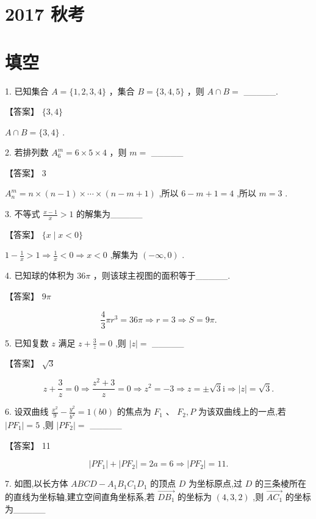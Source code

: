 \documentclass[10pt]{article}
\begin{document}
\section*{2017 秋考}

\section*{填空}

1. 已知集合 \(A = \{ 1,2,3,4\}\) ，集合 \(B = \{ 3,4,5\}\) ，则 \(A \cap  B =\) \_\_\_\_\_.

【答案】 \(\{ 3,4\}\)

\(A \cap  B = \{ 3,4\}\) .

2. 若排列数 \({A}_{6}^{m} = 6 \times  5 \times  4\) ，则 \(m =\) \_\_\_\_\_

【答案】 3

\({A}_{n}^{m} = n \times  \left( {n - 1}\right)  \times  \cdots  \times  \left( {n - m + 1}\right)\) ,所以 \(6 - m + 1 = 4\) ,所以 \(m = 3\) .

3. 不等式 \(\frac{x - 1}{x} > 1\) 的解集为\_\_\_\_\_

【答案】 \(\{ x \mid  x < 0\}\)

\(1 - \frac{1}{x} > 1 \Rightarrow  \frac{1}{x} < 0 \Rightarrow  x < 0\) ,解集为 \(\left( {-\infty ,0}\right)\) .

4. 已知球的体积为 \({36\pi }\) ，则该球主视图的面积等于\_\_\_\_\_.

【答案】 \({9\pi }\)

\[
\frac{4}{3}\pi {r}^{3} = {36\pi } \Rightarrow  r = 3 \Rightarrow  S = {9\pi }.
\]

5. 已知复数 \(z\) 满足 \(z + \frac{3}{z} = 0\) ,则 \(\left| z\right|  =\) \_\_\_\_\_

【答案】 \(\sqrt{3}\)

\[
z + \frac{3}{z} = 0 \Rightarrow  \frac{{z}^{2} + 3}{z} = 0 \Rightarrow  {z}^{2} =  - 3 \Rightarrow  z =  \pm  \sqrt{3}\mathrm{i} \Rightarrow  \left| z\right|  = \sqrt{3}.
\]

6. 设双曲线 \(\frac{{x}^{2}}{9} - \frac{{y}^{2}}{{b}^{2}} = 1\left( {b0}\right)\) 的焦点为 \({F}_{1}\text{ 、 }{F}_{2},P\) 为该双曲线上的一点,若 \(\left| {P{F}_{1}}\right|  = 5\) ,则 \(\left| {P{F}_{2}}\right|  =\) \_\_\_\_\_

【答案】 11

\[
\left| {P{F}_{1}}\right|  + \left| {P{F}_{2}}\right|  = {2a} = 6 \Rightarrow  \left| {P{F}_{2}}\right|  = {11}.
\]

7. 如图,以长方体 \({ABCD} - {A}_{1}{B}_{1}{C}_{1}{D}_{1}\) 的顶点 \(D\) 为坐标原点,过 \(D\) 的三条棱所在的直线为坐标轴,建立空间直角坐标系,若 \(\overrightarrow{D{B}_{1}}\) 的坐标为 \(\left( {4,3,2}\right)\) ,则 \(\overrightarrow{A{C}_{1}}\) 的坐标为\_\_\_\_\_
\end{document}
